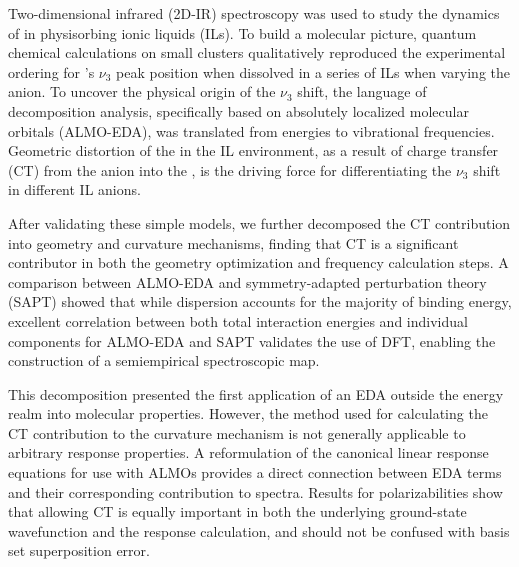 \documentclass[%
  class = article,%
  crop = false,%
  float = true,%
  multi = true,%
  preview = false,%
]{standalone}
\newcommand{\arlidimer}{\ce{Ar\bond{....}Li+}}
\begin{document}
Two-dimensional infrared (2D-IR) spectroscopy was used to study the dynamics of  in physisorbing ionic liquids (ILs). To build a molecular picture, quantum chemical calculations on small clusters qualitatively reproduced the experimental ordering for 's \(\nu_3\) peak position when dissolved in a series of ILs when varying the anion. To uncover the physical origin of the \(\nu_3\) shift, the language of decomposition analysis, specifically based on absolutely localized molecular orbitals (ALMO-EDA), was translated from energies to vibrational frequencies. Geometric distortion of the  in the IL environment, as a result of charge transfer (CT) from the anion into the , is the driving force for differentiating the  \(\nu_3\) shift in different IL anions.

After validating these simple models, we further decomposed the CT contribution into geometry and curvature mechanisms, finding that CT is a significant contributor in both the geometry optimization and frequency calculation steps. A comparison between ALMO-EDA and symmetry-adapted perturbation theory (SAPT) showed that while dispersion accounts for the majority of binding energy, excellent correlation between both total interaction energies and individual components for ALMO-EDA and SAPT validates the use of DFT, enabling the construction of a semiempirical spectroscopic map.

This decomposition presented the first application of an EDA outside the energy realm into molecular properties. However, the method used for calculating the CT contribution to the curvature mechanism is not generally applicable to arbitrary response properties. A reformulation of the canonical linear response equations for use with ALMOs provides a direct connection between EDA terms and their corresponding contribution to spectra. Results for \arlidimer{} polarizabilities show that allowing CT is equally important in both the underlying ground-state wavefunction and the response calculation, and should not be confused with basis set superposition error.
\end{document}
